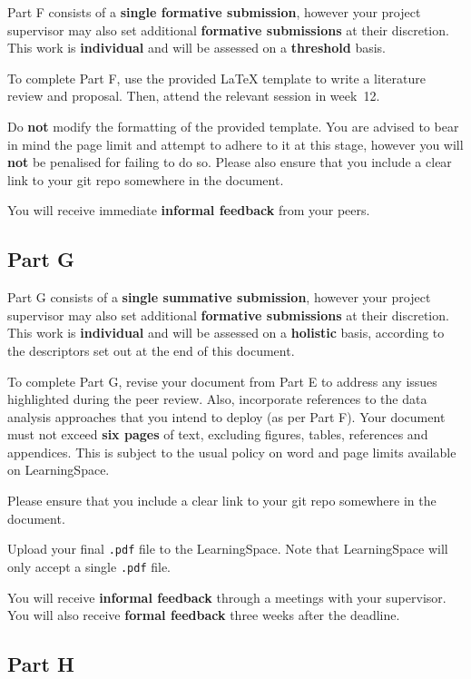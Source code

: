 Part F consists of a \textbf{single formative submission},
however your project supervisor may also set additional \textbf{formative submissions} at their discretion.
This work is \textbf{individual} and will be assessed on a \textbf{threshold} basis.

To complete Part F, use the provided LaTeX template to write a literature review and proposal. Then, attend the 
relevant session in week~12.

Do \textbf{not} modify the formatting of the provided template. You are advised to bear in mind the page limit 
and attempt to adhere to it at this stage, however you will \textbf{not} be penalised for failing to do so. 
Please also ensure that you include a clear link to your git repo somewhere in the document.

You will receive immediate \textbf{informal feedback} from your peers.

\subsection*{Part G}

Part G consists of a \textbf{single summative submission},
however your project supervisor may also set additional \textbf{formative submissions} at their discretion.
This work is \textbf{individual} and will be assessed on a \textbf{holistic} basis,
according to the descriptors set out at the end of this document.

To complete Part G, revise your document from Part E
to address any issues highlighted during the peer review. Also, incorporate references to the data analysis
approaches that you intend to deploy (as per Part F).
Your document must not exceed \textbf{six pages} of text,
excluding figures, tables, references and appendices.
This is subject to the usual policy on word and page limits available on LearningSpace.

Please ensure that you include a clear link to your git repo somewhere in the document.

Upload your final \texttt{.pdf} file to the LearningSpace.
Note that LearningSpace will only accept a single \texttt{.pdf} file.

You will receive \textbf{informal feedback} through a meetings with your supervisor.
You will also receive \textbf{formal feedback} three weeks after the deadline.

\subsection*{Part H}


